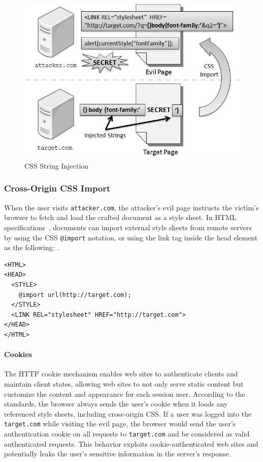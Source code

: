\documentclass{acm_proc_article-sp}
\begin{document}
\begin{figure}
\centering
\includegraphics[width=\linewidth]{injection.jpg}
\caption{CSS String Injection}
\label{figure:injection}
\end{figure}

\subsubsection{Cross-Origin CSS Import}
When the user visits \texttt{attacker.com}, the attacker's evil page instructs the victim's browser to fetch and load the crafted document as a style sheet. In HTML specifications~\cite{html}, documents can import external style sheets from remote servers by using the CSS \texttt{@import} notation, or using the link tag inside the head element as the following: .
\begin{verbatim}
<HTML>
<HEAD>
  <STYLE>
    @import url(http://target.com);
  </STYLE>
  <LINK REL="stylesheet" HREF="http://target.com">
</HEAD>
</HTML>
\end{verbatim}
\paragraph{Cookies}
The HTTP cookie mechanism enables web sites to authenticate clients and maintain client states, allowing web sites to not only serve static content but customize the content and appearance for each session user. According to the standards, the browser always sends the user's cookie when it loads any referenced style sheets, including cross-origin CSS. If a user was logged into the \texttt{target.com} while visiting the evil page, the browser would send the user's authentication cookie on all requests to \texttt{target.com} and be considered as valid authenticated requests. This behavior exploits cookie-authenticated web sites and potentially leaks the user's sensitive information in the server's response.
\end{document}
